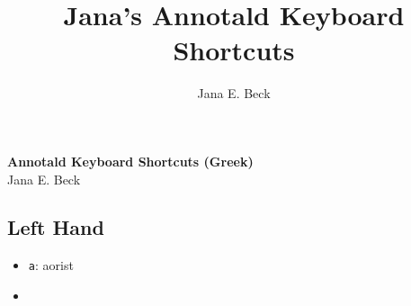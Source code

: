 \message{ !name(cheat-sheet.tex)}\documentclass[10pt]{article}
\title{Jana's Annotald Keyboard Shortcuts}
\author{Jana E. Beck}
\begin{document}

\begin{center}
\Large{\textbf{Annotald Keyboard Shortcuts (Greek)}}\\
Jana E. Beck
\end{center}
\begin{multicols}{2}
\section{Left Hand}
\label{sec:shortcuts-commands}

\begin{itemize}
\item \texttt{a}: aorist
\item 
\end{itemize}

\end{multicols}
\end{document}
